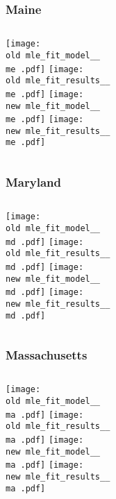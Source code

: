 \documentclass{beamer}
\newcommand{\old}{api-370-prod/pyseir/state_summaries/reports/}
\newcommand{\new}{new/pyseir/state_summaries/reports/}
\newcommand{\me}{Maine__23}
\newcommand{\md}{Maryland__24}
\newcommand{\ma}{Massachusetts__25}
\begin{document}
\begin{frame}
\frametitle{Maine}
    \begin{columns}[t]

       \texttt{[image: \\old mle\_fit\_model\_\_\\me .pdf]}
       \texttt{[image: \\old mle\_fit\_results\_\_\\me .pdf]}   
       \texttt{[image: \\new mle\_fit\_model\_\_\\me .pdf]}
       \texttt{[image: \\new mle\_fit\_results\_\_\\me .pdf]}   
\end{columns}
\end{frame}

\begin{frame}
\frametitle{Maryland}
    \begin{columns}[t]

       \texttt{[image: \\old mle\_fit\_model\_\_\\md .pdf]}
       \texttt{[image: \\old mle\_fit\_results\_\_\\md .pdf]}   
       \texttt{[image: \\new mle\_fit\_model\_\_\\md .pdf]}
       \texttt{[image: \\new mle\_fit\_results\_\_\\md .pdf]}   
\end{columns}
\end{frame}

\begin{frame}
\frametitle{Massachusetts}
    \begin{columns}[t]

       \texttt{[image: \\old mle\_fit\_model\_\_\\ma .pdf]}
       \texttt{[image: \\old mle\_fit\_results\_\_\\ma .pdf]}   
       \texttt{[image: \\new mle\_fit\_model\_\_\\ma .pdf]}
       \texttt{[image: \\new mle\_fit\_results\_\_\\ma .pdf]}   
\end{columns}
\end{frame}
\end{document}
